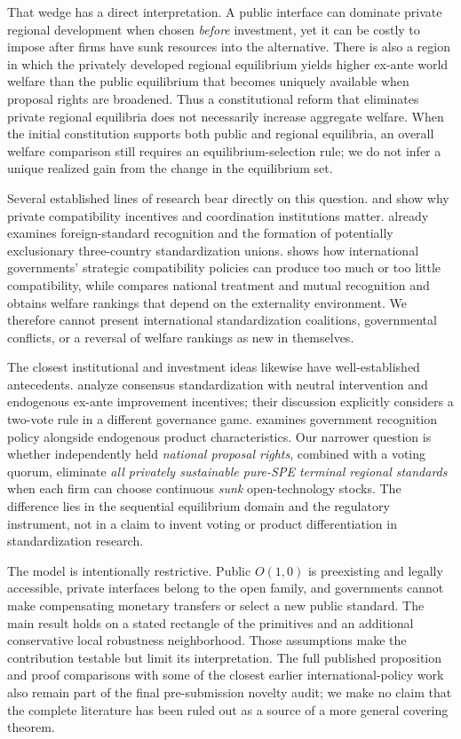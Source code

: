 That wedge has a direct interpretation. A public interface can dominate private regional development when chosen \emph{before} investment, yet it can be costly to impose after firms have sunk resources into the alternative. There is also a region in which the privately developed regional equilibrium yields higher ex-ante world welfare than the public equilibrium that becomes uniquely available when proposal rights are broadened. Thus a constitutional reform that eliminates private regional equilibria does not necessarily increase aggregate welfare. When the initial constitution supports both public and regional equilibria, an overall welfare comparison still requires an equilibrium-selection rule; we do not infer a unique realized gain from the change in the equilibrium set.

Several established lines of research bear directly on this question. \citet{KatzShapiro1985} and \citet{FarrellSaloner1988} show why private compatibility incentives and coordination institutions matter. \citet{GandalShy2001} already examines foreign-standard recognition and the formation of potentially exclusionary three-country standardization unions. \citet{Klimenko2009} shows how international governments' strategic compatibility policies can produce too much or too little compatibility, while \citet{Costinot2008} compares national treatment and mutual recognition and obtains welfare rankings that depend on the externality environment. We therefore cannot present international standardization coalitions, governmental conflicts, or a reversal of welfare rankings as new in themselves.

The closest institutional and investment ideas likewise have well-established antecedents. \citet{FarrellSimcoe2012} analyze consensus standardization with neutral intervention and endogenous ex-ante improvement incentives; their discussion explicitly considers a two-vote rule in a different governance game. \citet{Ruiz2004} examines government recognition policy alongside endogenous product characteristics. Our narrower question is whether independently held \emph{national proposal rights}, combined with a voting quorum, eliminate \emph{all privately sustainable pure-SPE terminal regional standards} when each firm can choose continuous \emph{sunk} open-technology stocks. The difference lies in the sequential equilibrium domain and the regulatory instrument, not in a claim to invent voting or product differentiation in standardization research.

The model is intentionally restrictive. Public \(O(1,0)\) is preexisting and legally accessible, private interfaces belong to the open family, and governments cannot make compensating monetary transfers or select a new public standard. The main result holds on a stated rectangle of the primitives and an additional conservative local robustness neighborhood. Those assumptions make the contribution testable but limit its interpretation. The full published proposition and proof comparisons with some of the closest earlier international-policy work also remain part of the final pre-submission novelty audit; we make no claim that the complete literature has been ruled out as a source of a more general covering theorem.

